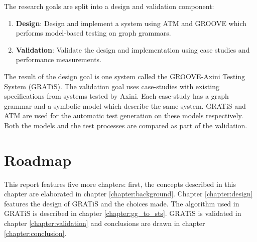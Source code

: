 The research goals are split into a design and validation component:
\begin{enumerate}
    \item \textbf{Design}: Design and implement a system using ATM and GROOVE which performs model-based testing on graph grammars.
    \item \textbf{Validation}: Validate the design and implementation using case studies and performance measurements.
\end{enumerate}

The result of the design goal is one system called the GROOVE-Axini Testing System (GRATiS). The validation goal uses case-studies with existing specifications from systems tested by Axini. Each case-study has a graph grammar and a symbolic model which describe the same system. GRATiS and ATM are used for the automatic test generation on these models respectively. Both the models and the test processes are compared as part of the validation.

\section{Roadmap}

This report features five more chapters: first, the concepts described in this chapter are elaborated in chapter \ref{chapter:background}. Chapter \ref{chapter:design} features the design of GRATiS and the choices made. The algorithm used in GRATiS is described in chapter \ref{chapter:gg_to_sts}. GRATiS is validated in chapter \ref{chapter:validation} and conclusions are drawn in chapter \ref{chapter:conclusion}.
